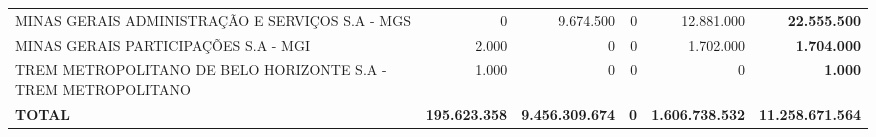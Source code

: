 \documentclass{article}
\begin{document}
\begin{longtable}[c]{m{5cm}|m{2.5cm}|m{2.5cm}|m{2.5cm}|m{2cm}|m{2cm}}
\multicolumn{1}{L{5cm}|}{MINAS GERAIS ADMINISTRAÇÃO E SERVIÇOS S.A - MGS} & \multicolumn{1}{r|}{          0} & \multicolumn{1}{r|}{9.674.500} & \multicolumn{1}{r|}{0} & \multicolumn{1}{r|}{12.881.000} & \multicolumn{1}{r}{ \textbf{22.555.500}} \\
\multicolumn{1}{L{5cm}|}{MINAS GERAIS PARTICIPAÇÕES S.A - MGI} & \multicolumn{1}{r|}{2.000} & \multicolumn{1}{r|}{            0} & \multicolumn{1}{r|}{0} & \multicolumn{1}{r|}{1.702.000} & \multicolumn{1}{r}{ \textbf{1.704.000}} \\
\multicolumn{1}{L{5cm}|}{TREM METROPOLITANO DE BELO HORIZONTE S.A - TREM METROPOLITANO} & \multicolumn{1}{r|}{1.000} & \multicolumn{1}{r|}{            0} & \multicolumn{1}{r|}{0} & \multicolumn{1}{r|}{            0} & \multicolumn{1}{r}{ \textbf{1.000}} \\
\hline
\multicolumn{1}{L{5cm}|}{ \textbf{TOTAL}} & \multicolumn{1}{r|}{ \textbf{195.623.358}} & \multicolumn{1}{r|}{ \textbf{9.456.309.674}} & \multicolumn{1}{r|}{ \textbf{0}} & \multicolumn{1}{r|}{ \textbf{1.606.738.532}} & \multicolumn{1}{r}{ \textbf{11.258.671.564}} \\
\end{longtable}
\newpage
{}
\end{document}
